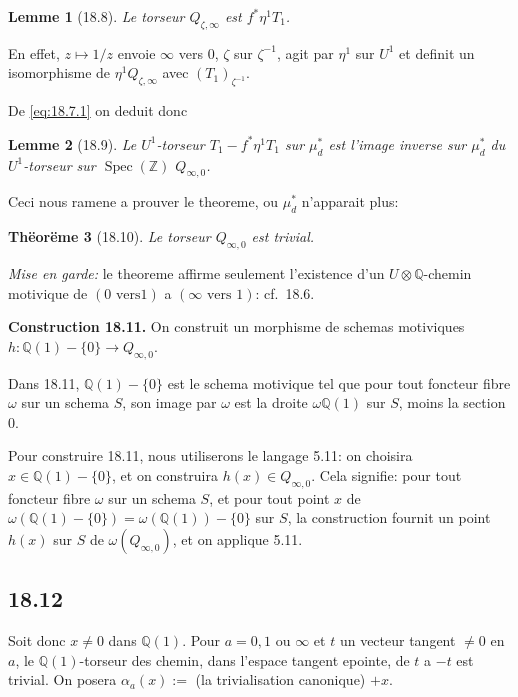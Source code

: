 \documentclass[12pt,a4paper]{article}
\theoremstyle{plain}
\newtheorem{theorem}{Th\"eor\"eme}[section]
\newtheorem{lemma}[theorem]{Lemme}
\theoremstyle{definition}
\theoremstyle{remark}
\DeclareMathOperator{\Spec}{Spec}
\newcommand{\ZZ}{\mathbb{Z}}
\newcommand{\QQ}{\mathbb{Q}}
\begin{document}
\begin{lemma}[18.8]\label{lem:18.8}
Le torseur $Q_{\zeta,\infty}$ est $f^*\eta^1 T_1$.
\end{lemma}

En effet, $z \mapsto 1/z$ envoie $\infty$ vers $0$, $\zeta$ sur
$\zeta^{-1}$, agit par $\eta^1$ sur $U^1$ et definit un isomorphisme de
$\eta^1 Q_{\zeta,\infty}$ avec $(T_1)_{\zeta^{-1}}$.

De \eqref{eq:18.7.1} on deduit donc

\begin{lemma}[18.9]\label{lem:18.9}
Le $U^1$-torseur $T_1 - f^*\eta^1 T_1$ sur $\mu_d^*$ est l'image
inverse sur $\mu_d^*$ du $U^1$-torseur sur $\Spec(\ZZ)$ $Q_{\infty,0}$.
\end{lemma}

Ceci nous ramene a prouver le theoreme, ou $\mu_d^*$ n'apparait plus:

\begin{theorem}[18.10]\label{thm:18.10}
Le torseur $Q_{\infty,0}$ est trivial.
\end{theorem}

\noindent \textit{Mise en garde:} le theoreme affirme seulement
l'existence d'un $U \otimes \QQ$-chemin motivique de $(0 \text{ vers
} 1)$ a $(\infty \text{ vers } 1)$: cf.\ 18.6.

\noindent \textbf{Construction 18.11.}\label{cons:18.11}
On construit un morphisme de schemas motiviques
$h : \QQ(1) - \{0\} \to Q_{\infty,0}$.

Dans 18.11, $\QQ(1) - \{0\}$ est le schema motivique tel que pour
tout foncteur fibre $\omega$ sur un schema $S$, son image par $\omega$
est la droite $\omega\QQ(1)$ sur $S$, moins la section $0$.

Pour construire 18.11, nous utiliserons le langage 5.11: on
choisira $x \in \QQ(1) - \{0\}$, et on construira
$h(x) \in Q_{\infty,0}$. Cela signifie: pour tout foncteur fibre
$\omega$ sur un schema $S$, et pour tout point $x$ de
$\omega(\QQ(1)-\{0\}) = \omega(\QQ(1)) - \{0\}$ sur $S$, la
construction fournit un point $h(x)$ sur $S$ de $\omega(Q_{\infty,0})$,
et on applique 5.11.

\subsection{18.12}

Soit donc $x \neq 0$ dans $\QQ(1)$. Pour $a = 0, 1$ ou $\infty$ et $t$
un vecteur tangent $\neq 0$ en $a$, le $\QQ(1)$-torseur des chemin,
dans l'espace tangent epointe, de $t$ a $-t$ est trivial. On posera
$\alpha_a(x) :=$ (la trivialisation canonique) $+ x$.
\end{document}

